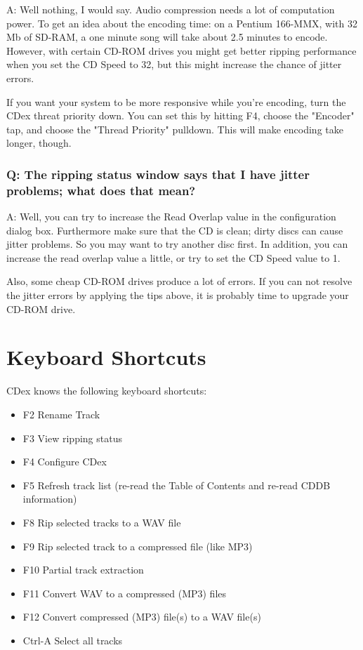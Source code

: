 A: Well nothing, I would say. Audio compression needs a lot of computation
power. To get an idea about the encoding time: on a Pentium 166-MMX, with
32 Mb of SD-RAM, a one minute song will take about 2.5 minutes to encode.
However, with certain CD-ROM drives you might get better ripping
performance when you set the CD Speed to 32, but this might increase the
chance of jitter errors.

If you want your system to be more responsive while you're encoding,
turn the CDex threat priority down.  You can set this by hitting F4, choose
the "Encoder" tap, and choose the "Thread Priority" pulldown.  This will
make encoding take longer, though.


\subsection{Q: The ripping status window says that I have jitter problems; what does that mean?}

A: Well, you can try to increase the Read Overlap value in the configuration
dialog box. Furthermore make sure that the CD is clean; dirty discs can cause
jitter problems. So you may want to try another disc first. In addition, you can
increase the read overlap value a little, or try to set the CD Speed value to 1.

Also, some cheap CD-ROM drives produce a lot of errors. If you can not resolve
the jitter errors by applying the tips above, it is probably time to upgrade your CD-ROM drive.


\chapter{Keyboard Shortcuts}\label{shortcuts}
CDex knows the following keyboard shortcuts:

\begin{itemize}
\itemsep=0pt
\item F2 Rename Track
\item F3 View ripping status
\item F4 Configure CDex
\item F5 Refresh track list (re-read the Table of Contents and re-read CDDB
information)
\item F8 Rip selected tracks to a WAV file
\item F9 Rip selected track to a compressed file (like MP3)
\item F10 Partial track extraction
\item F11 Convert WAV to a compressed (MP3) files
\item F12 Convert compressed (MP3) file(s) to a WAV file(s)
\item Ctrl-A Select all tracks
\end{itemize}

